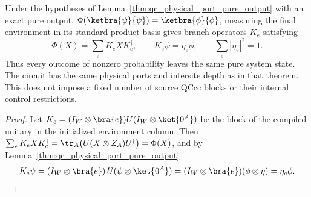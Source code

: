 \begin{lemma}
    \label{cor:qc_physical_port_pure_output_branches}
    Under the hypotheses of Lemma~\ref{thm:qc_physical_port_pure_output} with an exact pure output,
    $\Phi(\ketbra{\psi}{\psi})=\ketbra{\phi}{\phi}$, measuring the final environment in its standard product basis gives branch operators $K_e$ satisfying
    \[
        \Phi(X)=\sum_e K_e X K_e^\dagger,\qquad K_e\psi=\eta_e\phi,\qquad \sum_e|\eta_e|^2=1.
    \]
    Thus every outcome of nonzero probability leaves the same pure system state. The circuit has the same physical ports and intersite depth as in that theorem. This does not impose a fixed number of source QCcc blocks or their internal control restrictions.
\end{lemma}

\begin{proof}
    Let $K_e=(I_W\otimes\bra{e})U(I_W\otimes\ket{0^A})$ be the block of the
    compiled unitary in the initialized environment column. Then
    $\sum_e K_eXK_e^\dagger=\tr_A\bigl(U(X\otimes Z_A)U^\dagger\bigr)=\Phi(X)$,
    and by Lemma~\ref{thm:qc_physical_port_pure_output}
    \[
        K_e\psi=(I_W\otimes\bra{e})\,U(\psi\otimes\ket{0^A})
        =(I_W\otimes\bra{e})(\phi\otimes\eta)=\eta_e\phi.
    \]
\end{proof}




